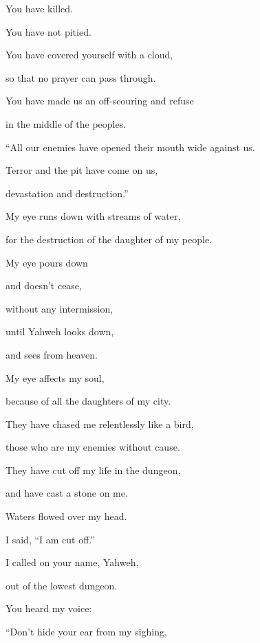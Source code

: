 {\par }{\QB You have killed.
\par }{\QB You have not pitied.
\par }{\Q {}You have covered yourself with a cloud,
\par }{\QB so that no prayer can pass through.
\par }{\Q {}You have made us an off-scouring and refuse
\par }{\QB in the middle of the peoples.
\par }{\BB \par }{\Q {}“All our enemies have opened their mouth wide against us.
\par }{\QB {}Terror and the pit have come on us,
\par }{\QB devastation and destruction.”
\par }{\BB \par }{\Q {}My eye runs down with streams of water,
\par }{\QB for the destruction of the daughter of my people.
\par }{\Q {}My eye pours down
\par }{\QB and doesn’t cease,
\par }{\QB without any intermission,
\par }{\Q {}until Yahweh looks down,
\par }{\QB and sees from heaven.
\par }{\Q {}My eye affects my soul,
\par }{\QB because of all the daughters of my city.
\par }{\BB \par }{\Q {}They have chased me relentlessly like a bird,
\par }{\QB those who are my enemies without cause.
\par }{\Q {}They have cut off my life in the dungeon,
\par }{\QB and have cast a stone on me.
\par }{\Q {}Waters flowed over my head.
\par }{\QB I said, “I am cut off.”
\par }{\BB \par }{\Q {}I called on your name, Yahweh,
\par }{\QB out of the lowest dungeon.
\par }{\Q {}You heard my voice:
\par }{\QB “Don’t hide your ear from my sighing,
}
